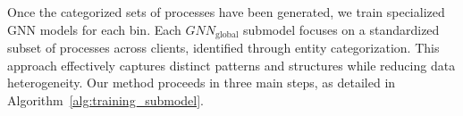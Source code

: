 

Once the categorized sets of processes have been generated, we train specialized GNN models for each bin. Each \({GNN}_{\text{global}}\) submodel focuses on a standardized subset of processes across clients, identified through entity categorization. This approach effectively captures distinct patterns and structures while reducing data heterogeneity. Our method proceeds in three main steps, as detailed in Algorithm~\ref{alg:training_submodel}.

